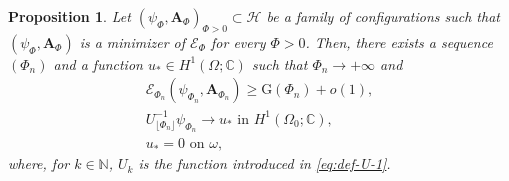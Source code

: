 \documentclass[10pt,a4paper]{amsart}
\newtheorem{proposition}{Proposition}
\newcommand{\Ab}{\mathbf A}
\newcommand{\C}{\mathbb C}
\newcommand{\Ef}{\mathcal E_\Phi}
\newcommand{\N}{\mathbb N}
\newcommand{\cE}{\mathcal E}
\newcommand{\cH}{\mathcal H}
\newcommand{\rG}{\mathrm G}
\begin{document}
\begin{proposition}\label{prop:conv-min}
Let  $(\psi_\Phi,\Ab_\Phi)_{\Phi>0}\subset\cH$ be a family of configurations such that $(\psi_\Phi,\Ab_\Phi)$ is a minimizer of $\Ef$ for every $\Phi>0$. Then, there exists a sequence $(\Phi_n)$ and a function $u_*\in H^1(\Omega;\C)$ such that $\Phi_n\to+\infty$ and
\[\begin{gathered}
\cE_{\Phi_n}(\psi_{\Phi_n},\Ab_{\Phi_n})\geq \rG(\Phi_n)+o(1),\\
 U_{\lfloor\Phi_n\rfloor}^{-1}\psi_{\Phi_n}\to u_*\text{ in }H^1(\Omega_0;\C),\\
 u_*=0\text{ on }\omega,
 \end{gathered}\]
 where, for $k\in\N$, $U_k$ is the function introduced in \eqref{eq:def-U-1}.
\end{proposition}
\end{document}
